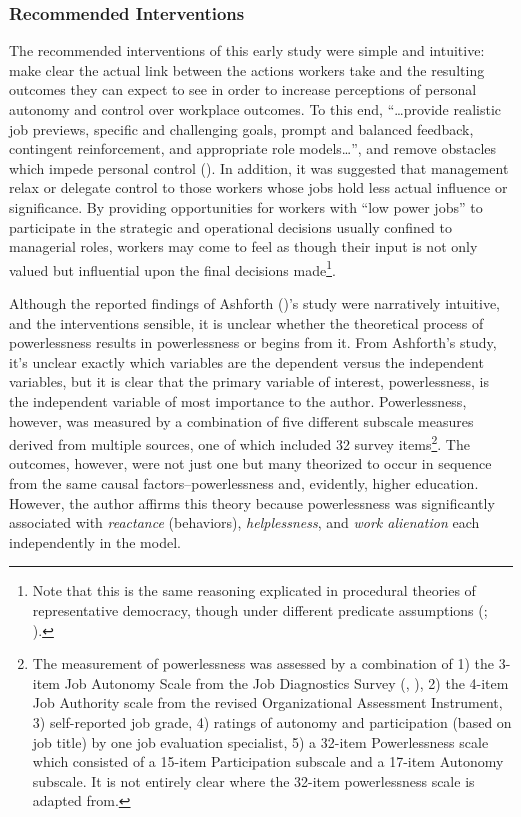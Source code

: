 \documentclass[
  11pt,
  a4paper,
]{article}
\begin{document}
\subsubsection{Recommended
Interventions}\label{recommended-interventions}

The recommended interventions of this early study were simple and
intuitive: make clear the actual link between the actions workers take
and the resulting outcomes they can expect to see in order to increase
perceptions of personal autonomy and control over workplace outcomes. To
this end, ``\ldots provide realistic job previews, specific and
challenging goals, prompt and balanced feedback, contingent
reinforcement, and appropriate role models\ldots{}'', and remove
obstacles which impede personal control
(). In addition, it was
suggested that management relax or delegate control to those workers
whose jobs hold less actual influence or significance. By providing
opportunities for workers with ``low power jobs'' to participate in the
strategic and operational decisions usually confined to managerial
roles, workers may come to feel as though their input is not only valued
but influential upon the final decisions made\footnote{Note that this is
  the same reasoning explicated in procedural theories of representative
  democracy, though under different predicate assumptions
  (; ).}.

Although the reported findings of Ashforth
()'s study were narratively intuitive,
and the interventions sensible, it is unclear whether the theoretical
process of powerlessness results in powerlessness or begins from it.
From Ashforth's study, it's unclear exactly which variables are the
dependent versus the independent variables, but it is clear that the
primary variable of interest, powerlessness, is the independent variable
of most importance to the author. Powerlessness, however, was measured
by a combination of five different subscale measures derived from
multiple sources, one of which included 32 survey items\footnote{The
  measurement of powerlessness was assessed by a combination of 1) the
  3-item Job Autonomy Scale from the Job Diagnostics Survey
  (,
  ), 2) the 4-item Job Authority scale
  from the revised Organizational Assessment Instrument, 3)
  self-reported job grade, 4) ratings of autonomy and participation
  (based on job title) by one job evaluation specialist, 5) a 32-item
  Powerlessness scale which consisted of a 15-item Participation
  subscale and a 17-item Autonomy subscale. It is not entirely clear
  where the 32-item powerlessness scale is adapted from.}. The outcomes,
however, were not just one but many theorized to occur in sequence from
the same causal factors--powerlessness and, evidently, higher education.
However, the author affirms this theory because powerlessness was
significantly associated with \emph{reactance} (behaviors),
\emph{helplessness}, and \emph{work alienation} each independently in
the model.
\end{document}

